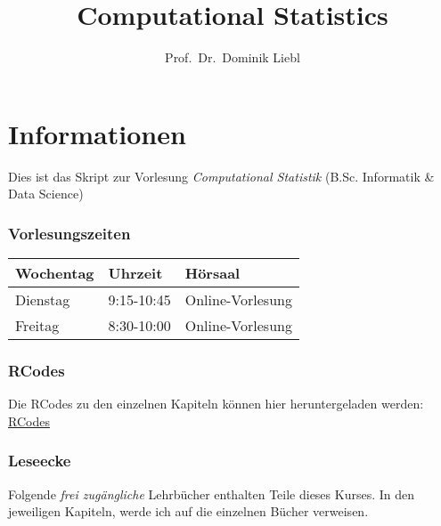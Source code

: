\documentclass[
  ngerman,
]{book}
\title{Computational Statistics}
\author{Prof.~Dr.~Dominik Liebl}
\date{}
\begin{document}
\maketitle

{
\setcounter{tocdepth}{1}
\tableofcontents
}
\hypertarget{informationen}{%
\chapter*{Informationen}\label{informationen}}

Dies ist das Skript zur Vorlesung \emph{Computational Statistik} (B.Sc. Informatik \& Data Science)

\hypertarget{vorlesungszeiten}{%
\subsection*{Vorlesungszeiten}\label{vorlesungszeiten}}

\begin{table}[H]
\centering
\begin{tabular}[t]{l|l|l}
\hline
Wochentag & Uhrzeit & Hörsaal\\
\hline
Dienstag & 9:15-10:45 & Online-Vorlesung\\
\hline
Freitag & 8:30-10:00 & Online-Vorlesung\\
\hline
\end{tabular}
\end{table}

\hypertarget{rcodes}{%
\subsection*{RCodes}\label{rcodes}}

Die RCodes zu den einzelnen Kapiteln können hier heruntergeladen werden: \href{https://github.com/lidom/Computational_Statistics_Script/tree/main/RCodes}{RCodes}

\hypertarget{leseecke}{%
\subsection*{Leseecke}\label{leseecke}}

Folgende \emph{frei zugängliche} Lehrbücher enthalten Teile dieses Kurses. In den jeweiligen Kapiteln, werde ich auf die einzelnen Bücher verweisen.
\end{document}
